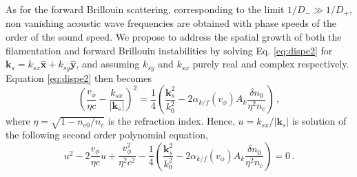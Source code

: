 \documentclass[
 reprint,
 superscriptaddress,
 amsmath,amssymb,
 aps,
]{revtex4-1}
\begin{document}
As for the forward Brillouin scattering,  corresponding to the limit $1/D_-\gg1/D_+$, non vanishing acoustic wave frequencies are obtained with  phase speeds of the order of the sound speed. We propose to address the spatial growth of both the filamentation and forward Brillouin instabilities  by solving Eq. \eqref{eq:dispe2} for  $\mathbf{k}_s = k_{sx} \hat{\mathbf{x}} +k_{sy} \hat{\mathbf{y}}$, and assuming 
$ k_{sy}$ and $k_{sx}$ purely real and complex  respectively. Equation \eqref{eq:dispe2} then becomes 
\begin{equation}\label{eq:dispe3} 
\left(\frac{v_\phi}{\eta c} - 
\frac{ k_{sx}}{\vert \mathbf{k}_s\vert }\right)^2
=\frac{1}{4} \left( \frac{\mathbf{k}_s^2}{k_0^2} - 2\alpha_{k/f}(v_\phi)A_k\frac{\delta n_0}{\eta^2n_c} \right) 
\, ,
\end{equation}
where $\eta=\sqrt{1-n_{e0}/n_c}$ is the refraction index.
Hence, $u =  k_{sx}/\vert \mathbf{k}_s\vert $ is solution of the following second order polynomial equation, 
\begin{equation}\label{eq:dispe2poly} 
u^2 -2\frac{v_\phi}{\eta c}u +\frac{v_\phi^2}{\eta^2 c^2}-\frac{1}{4}\left( \frac{\mathbf{k}_s^2}{k_0^2} - 2\alpha_{k/f}(v_\phi)A_k\frac{\delta n_0}{\eta^2n_c} \right) =0 
\, .
\end{equation}
\end{document}
